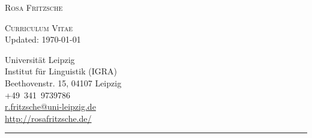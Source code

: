 \documentclass[11pt]{article}
\begin{document}
\pagestyle{empty}

\noindent\begin{minipage}{.48\textwidth}

\begin{flushleft}
\huge{\textsc{Rosa Fritzsche}}
\vspace{.5\baselineskip}

\Large{\textsc{Curriculum Vitae}}\\
\vspace{\baselineskip}
\small{Updated: \today}
\end{flushleft}
\end{minipage}\hfill%
\begin{minipage}{.48\textwidth}
\begin{flushright}
	Universität Leipzig\\
	Institut für Linguistik (IGRA)\\
	Beethovenstr. 15, 04107 Leipzig\\
	+49~341~9739786 \\
	\href{mailto:r.fritzsche@uni-leipzig.de}{r.fritzsche@uni-leipzig.de} \\
	\href{http://rosafritzsche.de/}{http://rosafritzsche.de/}\\
\end{flushright}
\end{minipage}

\noindent\rule{\textwidth}{1pt}






\end{document}
